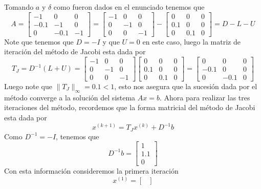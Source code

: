 \begin{enumerate}
    \begin{solution}
        Tomando $a$ y $\delta$ como fueron dados en el enunciado tenemos que 
       $$A=\begin{bmatrix}
           -1&0&0\\
           -0.1&-1&0\\
           0&-0.1&-1
       \end{bmatrix}=\begin{bmatrix}
           -1&0&0\\
           0&-1&0\\
           0&0&-1
       \end{bmatrix}-\begin{bmatrix}
           0&0&0\\
           0.1&0&0\\
           0&0.1&0
       \end{bmatrix}=D-L-U$$
       Note que tenemos que $D=-I$ y que $U=0$ en este caso, luego la matriz de iteración del método de Jacobi esta dada por
       $$T_J=D^{-1}(L+U)=\begin{bmatrix}
           -1&0&0\\
           0&-1&0\\
           0&0&-1
       \end{bmatrix}\begin{bmatrix}
            0&0&0\\
           0.1&0&0\\
           0&0.1&0
       \end{bmatrix}=\begin{bmatrix}
           0&0&0\\
           -0.1&0&0\\
           0&-0.1&0
       \end{bmatrix}$$
       Luego note que $\|T_J\|_\infty=0.1<1$,  esto nos asegura que la sucesión dada por el método converge a la solución del sistema $Ax=b.$
        Ahora para realizar las tres iteraciones del método, recordemos que la forma matricial del método de Jacobi esta dada por
        $$x^{(k+1)}=T_Jx^{(k)}+D^{-1}b$$
        Como $D^{-1}=-I$, tenemos que 
        $$D^{-1}b=\begin{bmatrix}
            1\\
            1.1\\
            0
        \end{bmatrix}$$
        Con esta información consideremos la primera iteración
        $$x^{(1)}=\begin{bmatrix}

\end{bmatrix}$$
\end{solution}
\end{enumerate}
